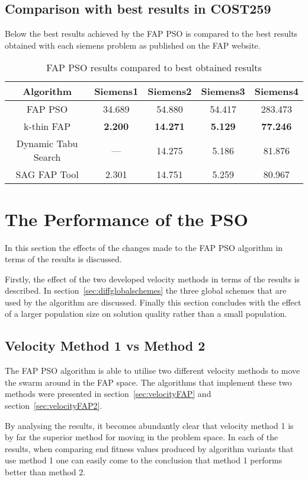 \subsection{Comparison with best results in COST259}
Below the best results achieved by the FAP PSO is compared to the best results obtained with each siemens problem as published on the FAP website\cite{FAPWeb}.
\begin{table}[H]
\centering
	\begin{tabular}{| c | c | c | c | c |}
	\hline
	Algorithm & Siemens1 & Siemens2 & Siemens3 & Siemens4 \\ \hline
	FAP PSO & 34.689 & 54.880 & 54.417 & 283.473 \\ \hline
	k-thin FAP & \textbf{2.200} & \textbf{14.271} & \textbf{5.129} & \textbf{77.246} \\ \hline
	Dynamic Tabu Search & --- & 14.275 & 5.186 & 81.876 \\ \hline
	SAG FAP Tool & 2.301 & 14.751 & 5.259 & 80.967 \\ \hline
	\end{tabular}
\caption{FAP PSO results compared to best obtained results}
\label{tab:siem4m2}
\end{table}
\section{The Performance of the PSO}
In this section the effects of the changes made to the FAP PSO algorithm in terms of the results is discussed. 

Firstly, the effect of the two developed velocity methods in terms of the results is described. In section~\ref{sec:diffglobalschemes} the three global schemes that are used by the algorithm are discussed. Finally this section concludes with the effect of a larger population size on solution quality rather than a small population.
\subsection{Velocity Method 1 vs Method 2}
The FAP PSO algorithm is able to utilise two different velocity methods to move the swarm around in the FAP space. The algorithms that implement these two methods were presented in section~\ref{sec:velocityFAP} and section~\ref{sec:velocityFAP2}.

By analysing the results, it becomes abundantly clear that velocity method 1 is by far the superior method for moving in the problem space. In each of the results, when comparing end fitness values produced by algorithm variants that use method 1 one can easily come to the conclusion that method 1 performs better than method 2.

